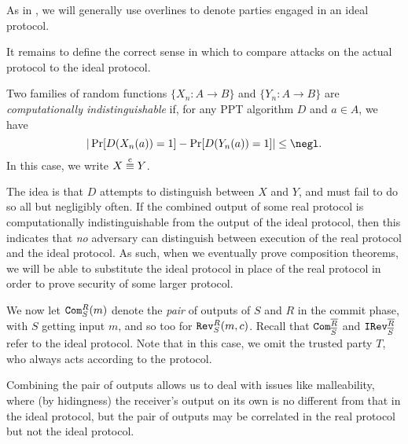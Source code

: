 \begin{ntn}
	As in , we will generally use overlines to denote
	parties engaged in an ideal protocol.
\end{ntn}

\noindent
It remains to define the correct sense in which to compare attacks on the actual
protocol to the ideal protocol.

\begin{dfn}\label{def:computataional indistinguishability}
	Two families of random functions $\{X_n: A\rightarrow B\}$ and $\{Y_n:
		A\rightarrow B\}$ are \emph{computationally indistinguishable} if, for any
	PPT algorithm $D$ and $a\in A$, we have\[
		|\Pr[D(X_n(a)) = 1] - \Pr[D(Y_n(a)) = 1]| \leq \negl.
	\]In this case, we write $X\overset{\text{c}}{\equiv} Y$.
\end{dfn}

\noindent
The idea is that $D$ attempts to distinguish between $X$ and $Y$, and must fail
to do so all but negligibly often. If the combined output of some real protocol is
computationally indistinguishable from the output of the ideal protocol, then
this indicates that \emph{no} adversary can distinguish between execution of the real
protocol and the ideal protocol. As such, when we eventually prove composition
theorems, we will be able to substitute the ideal protocol in place of the real
protocol in order to prove security of some larger protocol.

\begin{ntn}
	We now let ${\texttt{Com}}_S^R(m)$ denote the \emph{pair} of outputs of $S$ and $R$
	in the commit phase, with $S$ getting input $m$, and so too for
	${\texttt{Rev}}_S^R(m, c)$. Recall that ${\texttt{Com}}_{{\overline{S}}}^{{\overline{R}}}$ and
	${\texttt{IRev}}_{{\overline{S}}}^{{\overline{R}}}$ refer to the ideal protocol. Note that in
	this case, we omit the trusted party $T$, who always acts according to the
	protocol.
\end{ntn}

\noindent
Combining the pair of outputs allows us to deal with issues like malleability,
where (by hidingness) the receiver's output on its own is no different from that
in the ideal protocol, but the pair of outputs may be correlated in the real
protocol but not the ideal protocol.

